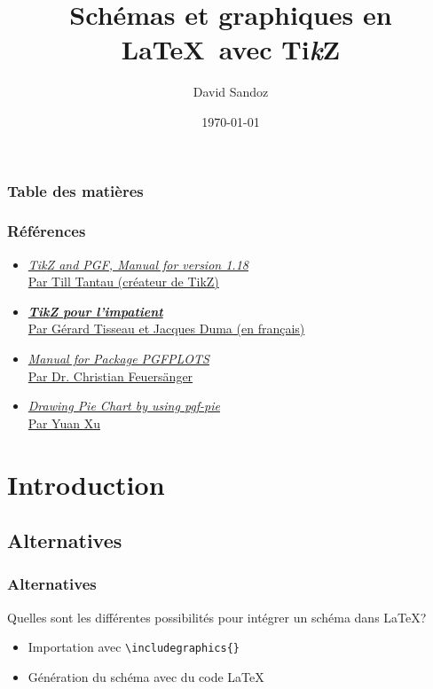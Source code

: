 \documentclass{clic_latex_beamer}
\newcommand{\TikZ}{Ti\textit{k}Z }
\begin{document}
\title{Schémas et graphiques en \LaTeX\ avec \TikZ}
\author{David Sandoz}
\date{\today}
\titlegraphic{\ccbysa}

\frame{\titlepage}


\begin{frame}
\frametitle{Table des matières}
\begin{multicols}{2}
\tableofcontents[]
\end{multicols}
\end{frame}

 
\begin{frame}
\frametitle{Références}
\begin{itemize}
\item \href{http://paws.wcu.edu/tsfoguel/tikzpgfmanual.pdf }{\emph{\TikZ and PGF, Manual for version 1.18}\\ Par Till Tantau (créateur de TikZ)}
\item \href{http://math.et.info.free.fr/TikZ/bdd/TikZ-Impatient.pdf}{\emph{\textbf{\TikZ pour l’impatient}}\\ Par Gérard Tisseau et Jacques Duma (en français)}
\item \href{http://pgfplots.sourceforge.net/pgfplots.pdf}{\emph{Manual for Package \uppercase{pgfplots}}\\ Par Dr. Christian Feuersänger}
\item \href{http://pgf-pie.googlecode.com/git/release/pgf-pie-0.2/pgf-pie-manual.pdf}{\emph{Drawing Pie Chart by using pgf-pie}\\ Par Yuan Xu}
\end{itemize}
\end{frame}


\section{Introduction}
\subsection{Alternatives}
\begin{frame}
\frametitle{Alternatives}
Quelles sont les différentes possibilités pour intégrer un schéma dans \LaTeX ?
\begin{itemize}
\item Importation avec \texttt{\textbackslash includegraphics\{\}}
\item Génération du schéma avec du code \LaTeX
\end{itemize}
\end{frame}
 
\end{document}
